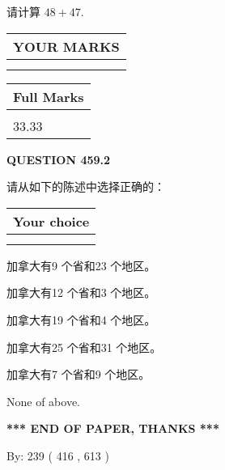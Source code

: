 \documentclass{ctexart}
\begin{document}
  
 
请计算 $ %
48 +  %
47 $.
 

 

 
  
\vspace{0.2in}
  
\noindent\begin{tabular}{|l|}
\hline
 YOUR MARKS  \\
\hline
 \\ 
 \\ 
\hline
\end{tabular}
\hspace{0.05in} \begin{tabular}{|l|}
\hline
 Full Marks  \\
\hline
 \\ 
33.33 \\
\hline
\end{tabular}
{\textbf{\Large{QUESTION
459.2 
}}}
  
  
请从如下的陈述中选择正确的：
  
  
\noindent\hspace{3.0in} \begin{tabular}{|l|}
\hline
Your choice \\
\hline
 \\ 
 \\ 
\hline
\end{tabular}
  
  
 
 
加拿大有9 个省和23 个地区。
 
 
加拿大有12 个省和3 个地区。
 
 
加拿大有19 个省和4 个地区。
 
 
加拿大有25 个省和31 个地区。
 
 
加拿大有7 个省和9 个地区。
 
 
 None of above.
 
 
   
   
 \vspace{0.2in}
 
   
   
   
   
\vspace{1.0in} 
{\textbf{\large{ *** END OF PAPER, THANKS *** }}} 
   
   
\hspace{1.0in} By: 
 239 ( 416 ,  613 )
   
\end{document}

